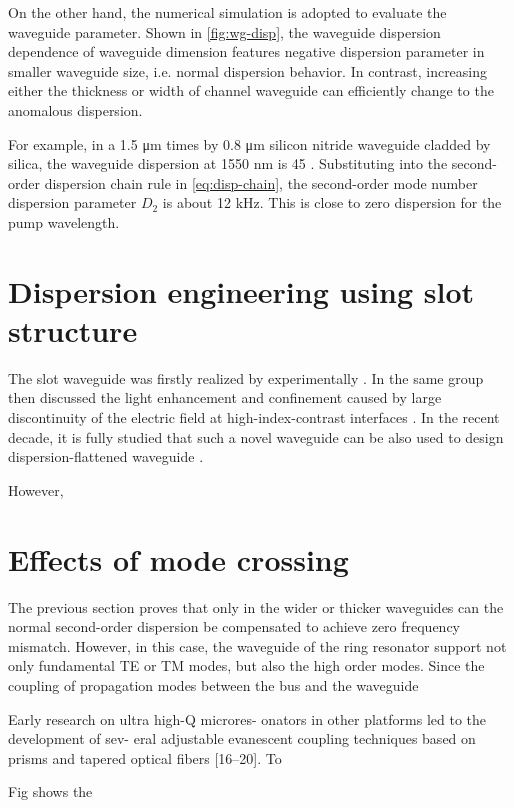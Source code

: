 \begin{figure}
    \centering
    
    \label{fig:Luke-si3n4}
\end{figure}

On the other hand, the numerical simulation is adopted to evaluate the waveguide parameter. Shown in \autoref{fig:wg-disp}, the waveguide dispersion dependence of waveguide dimension features negative dispersion parameter in smaller waveguide size, i.e. normal dispersion behavior. In contrast, increasing either the thickness or width of channel waveguide can efficiently change to the anomalous dispersion.

For example, in a 1.5 \si{\um} times by 0.8 \si{\um} silicon nitride waveguide cladded by silica, the waveguide dispersion at 1550 \si{\nm} is 45 \dispu. Substituting into the second-order dispersion chain rule in \autoref{eq:disp-chain}, the second-order mode number dispersion parameter $ D_2 $ is about 12 kHz. This is close to zero dispersion for the pump wavelength.

\begin{figure}
	\centering
	
	\label{fig:wg-disp}
\end{figure}


\section{Dispersion engineering using slot structure}

The slot waveguide was firstly realized by \citeauthor{Xu2004} experimentally \cite{Xu2004}. In the same group \citeauthor{Almeida2004} then discussed the light enhancement and confinement caused by large discontinuity of the electric field at high-index-contrast interfaces \cite{Almeida2004}. In the recent decade, it is fully studied that such a novel waveguide can be also used to design dispersion-flattened waveguide \cites{Mas2010, Zhang2010, Zhu2012, Nolte2013}.

However, 
\section{Effects of mode crossing}

The previous section proves that only in the wider or thicker waveguides can the normal second-order dispersion be compensated to achieve zero frequency mismatch. However, in this case, the waveguide of the ring resonator support not only fundamental TE or TM modes, but also the high order modes. Since the coupling of propagation modes between the bus and the waveguide 

Early research on ultra high-Q microres- onators in other platforms led to the development of sev- eral adjustable evanescent coupling techniques based on prisms and tapered optical fibers [16–20]. To


Fig shows the 